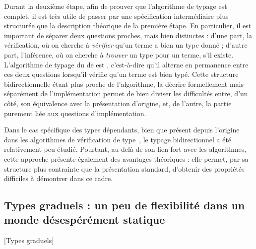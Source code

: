 Durant la deuxième étape, afin de prouver que l’algorithme de typage est complet,
il est très utile de
passer par une spécification intermédiaire plus structurée que la description
théorique de la première étape.
En particulier, il est important de séparer deux questions proches, mais
bien distinctes :
d’une part, la vérification, où on cherche à \emph{vérifier}
qu’un terme a bien un type donné ;
d’autre part, l’inférence, où on cherche à \emph{trouver}
un type pour un terme, s’il existe.
L’algorithme de typage du  de  est ,
c’est-à-dire qu’il alterne en permanence entre ces deux questions
lorsqu’il vérifie qu’un terme est bien typé.
Cette structure bidirectionnelle étant plus proche de l’algorithme,
la décrire formellement mais séparément de l’implémentation
permet de bien diviser les difficultés entre, d’un côté, son équivalence avec la présentation
d’origine, et, de l’autre, la partie purement liée aux questions d’implémentation.

Dans le cas spécifique des types dépendants, bien que présent depuis l’origine dans les algorithmes de vérification de type~,
le typage bidirectionnel a été relativement peu étudié.
Pourtant, au-delà de son lien fort avec les algorithmes,
cette approche présente également des avantages théoriques : elle permet,
par sa structure plus contrainte que la présentation standard,
d’obtenir des propriétés difficiles à démontrer dans ce cadre.

\subsection{Types graduels : un peu de flexibilité dans un monde désespérément statique}
  [Types graduels]
\label{sec:intro-graduel}

